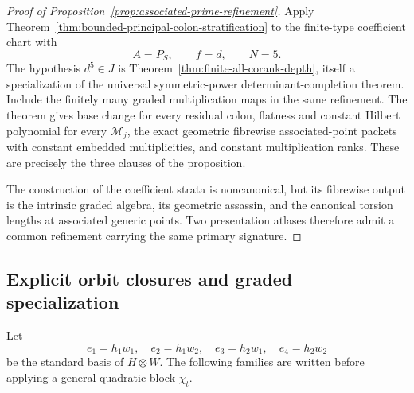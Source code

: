 \begin{proof}[Proof of Proposition~\ref{prop:associated-prime-refinement}]
Apply Theorem~\ref{thm:bounded-principal-colon-stratification} to the
finite-type coefficient chart with
\[
 A=P_S,\qquad f=d,\qquad N=5.
\]
The hypothesis \(d^5\in J\) is
Theorem~\ref{thm:finite-all-corank-depth}, itself a specialization of
the universal symmetric-power determinant-completion theorem.
Include the finitely many graded multiplication maps in the same
refinement.  The theorem gives base change for every residual colon,
flatness and constant Hilbert polynomial for every \(\mathcal M_j\),
the exact geometric fibrewise associated-point packets with constant
embedded multiplicities, and constant multiplication ranks.  These
are precisely the three clauses of the proposition.

The construction of the coefficient strata is noncanonical, but its
fibrewise output is the intrinsic graded algebra, its geometric
assassin, and the canonical torsion lengths at associated generic
points.  Two presentation atlases therefore admit a common refinement
carrying the same primary signature.
\end{proof}

\subsection{Explicit orbit closures and graded specialization}

Let
\[
 e_1=h_1w_1,\quad e_2=h_1w_2,\quad
 e_3=h_2w_1,\quad e_4=h_2w_2
\]
be the standard basis of \(H\otimes W\).  The following families
are written before applying a general quadratic block \(\chi_t\).


